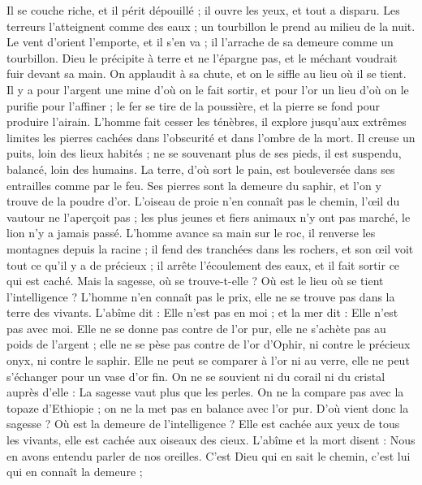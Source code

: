\begin{multicols}{2}
Il se couche riche, et il périt dépouillé ; il ouvre les yeux, et tout a disparu.
Les terreurs l'atteignent comme des eaux ; un tourbillon le prend au milieu de la nuit.
Le vent d'orient l'emporte, et il s'en va ; il l'arrache de sa demeure comme un tourbillon.
Dieu le précipite à terre et ne l'épargne pas, et le méchant voudrait fuir devant sa main.
On applaudit à sa chute, et on le siffle au lieu où il se tient.
\VerseOne{}Il y a pour l'argent une mine d'où on le fait sortir, et pour l'or un lieu d'où on le purifie pour l'affiner ;
le fer se tire de la poussière, et la pierre se fond pour produire l'airain.
L'homme fait cesser les ténèbres, il explore jusqu'aux extrêmes limites les pierres cachées dans l'obscurité et dans l'ombre de la mort.
Il creuse un puits, loin des lieux habités ; ne se souvenant plus de ses pieds, il est suspendu, balancé, loin des humains.
La terre, d'où sort le pain, est bouleversée dans ses entrailles comme par le feu.
Ses pierres sont la demeure du saphir, et l'on y trouve de la poudre d'or.
L'oiseau de proie n'en connaît pas le chemin, l'œil du vautour ne l'aperçoit pas ;
les plus jeunes et fiers animaux n'y ont pas marché, le lion n'y a jamais passé.
L'homme avance sa main sur le roc, il renverse les montagnes depuis la racine ;
il fend des tranchées dans les rochers, et son œil voit tout ce qu'il y a de précieux ;
il arrête l'écoulement des eaux, et il fait sortir ce qui est caché.
Mais la sagesse, où se trouve-t-elle ? Où est le lieu où se tient l'intelligence ?
L'homme n'en connaît pas le prix, elle ne se trouve pas dans la terre des vivants.
L'abîme dit : Elle n'est pas en moi ; et la mer dit : Elle n'est pas avec moi.
Elle ne se donne pas contre de l'or pur, elle ne s'achète pas au poids de l'argent ;
elle ne se pèse pas contre de l'or d'Ophir, ni contre le précieux onyx, ni contre le saphir.
Elle ne peut se comparer à l'or ni au verre, elle ne peut s'échanger pour un vase d'or fin.
On ne se souvient ni du corail ni du cristal auprès d'elle : La sagesse vaut plus que les perles.
On ne la compare pas avec la topaze d'Ethiopie ; on ne la met pas en balance avec l'or pur.
D'où vient donc la sagesse ? Où est la demeure de l'intelligence ?
Elle est cachée aux yeux de tous les vivants, elle est cachée aux oiseaux des cieux.
L'abîme et la mort disent : Nous en avons entendu parler de nos oreilles.
C'est Dieu qui en sait le chemin, c'est lui qui en connaît la demeure ;

\end{multicols}
